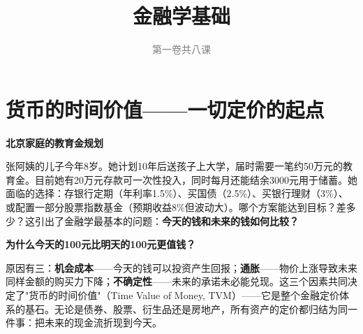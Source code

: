 \documentclass[a4paper,11pt]{ctexbook}
\title{\textcolor{themeblue}{\Huge\textbf{金融学基础}}}
\subtitle{\textcolor{gray}{第一卷\quad 共八课}}
\author{}
\date{}
\begin{document}
\maketitle
\thispagestyle{empty}
\tableofcontents
\newpage

\chapter{货币的时间价值——一切定价的起点}

\begin{scenario}
\textbf{北京家庭的教育金规划}

张阿姨的儿子今年8岁。她计划10年后送孩子上大学，届时需要一笔约50万元的教育金。目前她有20万元存款可一次性投入，同时每月还能结余3000元用于储蓄。她面临的选择：存银行定期（年利率1.5\%）、买国债（2.5\%）、买银行理财（3\%）、或配置一部分股票指数基金（预期收益8\%但波动大）。哪个方案能达到目标？差多少？这引出了金融学最基本的问题：\textbf{今天的钱和未来的钱如何比较？}
\end{scenario}

\begin{qualitative}
\textbf{为什么今天的100元比明天的100元更值钱？}

原因有三：\textbf{机会成本}——今天的钱可以投资产生回报；\textbf{通胀}——物价上涨导致未来同样金额的购买力下降；\textbf{不确定性}——未来的承诺未必能兑现。这三个因素共同决定了"货币的时间价值"（Time Value of Money, TVM）——它是整个金融定价体系的基石。无论是债券、股票、衍生品还是房地产，所有资产的定价都归结为同一件事：把未来的现金流折现到今天。
\end{qualitative}
\end{document}
